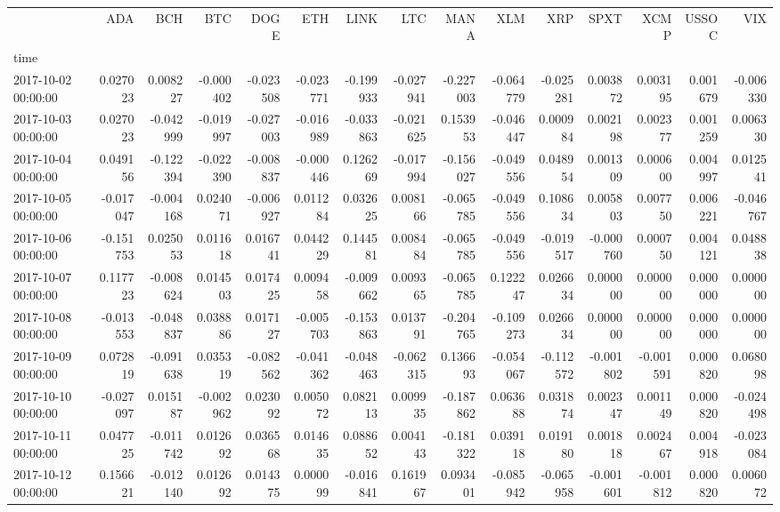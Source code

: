 \begin{tabular}{lrrrrrrrrrrrrrr}
\toprule
 & ADA & BCH & BTC & DOGE & ETH & LINK & LTC & MANA & XLM & XRP & SPXT & XCMP & USSOC & VIX \\
time &  &  &  &  &  &  &  &  &  &  &  &  &  &  \\
\midrule
2017-10-02 00:00:00 & 0.027023 & 0.008227 & -0.000402 & -0.023508 & -0.023771 & -0.199933 & -0.027941 & -0.227003 & -0.064779 & -0.025281 & 0.003872 & 0.003195 & 0.001679 & -0.006330 \\
2017-10-03 00:00:00 & 0.027023 & -0.042999 & -0.019997 & -0.027003 & -0.016989 & -0.033863 & -0.021625 & 0.153953 & -0.046447 & 0.000984 & 0.002198 & 0.002377 & 0.001259 & 0.006330 \\
2017-10-04 00:00:00 & 0.049156 & -0.122394 & -0.022390 & -0.008837 & -0.000446 & 0.126269 & -0.017994 & -0.156027 & -0.049556 & 0.048954 & 0.001309 & 0.000600 & 0.004997 & 0.012541 \\
2017-10-05 00:00:00 & -0.017047 & -0.004168 & 0.024071 & -0.006927 & 0.011284 & 0.032625 & 0.008166 & -0.065785 & -0.049556 & 0.108634 & 0.005803 & 0.007750 & 0.006221 & -0.046767 \\
2017-10-06 00:00:00 & -0.151753 & 0.025053 & 0.011618 & 0.016741 & 0.044229 & 0.144581 & 0.008484 & -0.065785 & -0.049556 & -0.019517 & -0.000760 & 0.000750 & 0.004121 & 0.048838 \\
2017-10-07 00:00:00 & 0.117723 & -0.008624 & 0.014503 & 0.017425 & 0.009458 & -0.009662 & 0.009365 & -0.065785 & 0.122247 & 0.026634 & 0.000000 & 0.000000 & 0.000000 & 0.000000 \\
2017-10-08 00:00:00 & -0.013553 & -0.048837 & 0.038886 & 0.017127 & -0.005703 & -0.153863 & 0.013791 & -0.204765 & -0.109273 & 0.026634 & 0.000000 & 0.000000 & 0.000000 & 0.000000 \\
2017-10-09 00:00:00 & 0.072819 & -0.091638 & 0.035319 & -0.082562 & -0.041362 & -0.048463 & -0.062315 & 0.136693 & -0.054067 & -0.112572 & -0.001802 & -0.001591 & 0.000820 & 0.068098 \\
2017-10-10 00:00:00 & -0.027097 & 0.015187 & -0.002962 & 0.023092 & 0.005072 & 0.082113 & 0.009935 & -0.187862 & 0.063688 & 0.031874 & 0.002347 & 0.001149 & 0.000820 & -0.024498 \\
2017-10-11 00:00:00 & 0.047725 & -0.011742 & 0.012692 & 0.036568 & 0.014635 & 0.088652 & 0.004143 & -0.181322 & 0.039118 & 0.019180 & 0.001818 & 0.002467 & 0.004918 & -0.023084 \\
2017-10-12 00:00:00 & 0.156621 & -0.012140 & 0.012692 & 0.014375 & 0.000099 & -0.016841 & 0.161967 & 0.093401 & -0.085942 & -0.065958 & -0.001601 & -0.001812 & 0.000820 & 0.006072 \\

\end{tabular}
